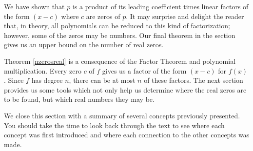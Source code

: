 We have shown that $p$ is a product of its leading coefficient times linear factors of the form $(x-c)$ where $c$ are zeros of $p$. It may surprise and delight the reader that, in theory, all polynomials can be reduced to this kind of factorization; however, some of the zeros may be  numbers.   Our final theorem in the section gives us an upper bound on the number of real zeros. 

\medskip


\medskip

Theorem \ref{nzerosreal} is a consequence of the Factor Theorem and polynomial multiplication.  Every zero $c$ of $f$ gives us a factor of the form $(x-c)$ for $f(x)$.  Since $f$ has degree $n$, there can be at most $n$ of these factors.  The next section provides us some tools which not only help us determine where the real zeros are to be found, but which real numbers they may be.

\medskip

We close this section with a summary of several concepts previously presented.  You should take the time to look back through the text to see where each concept was first introduced and where each connection to the other concepts was made.

\medskip


